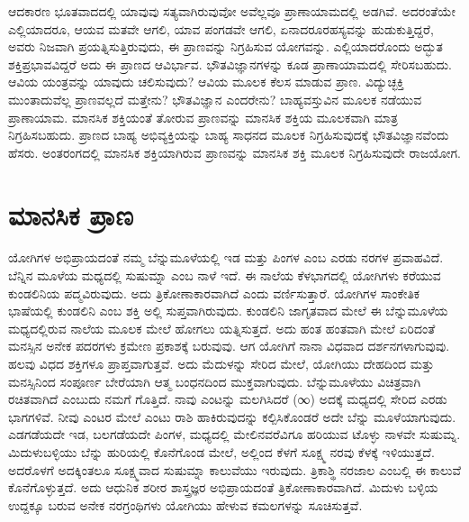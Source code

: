 ಆದಕಾರಣ ಭೂತವಾದದಲ್ಲಿ ಯಾವುವು ಸತ್ಯವಾಗಿರುವುವೋ ಅವೆಲ್ಲವೂ ಪ್ರಾಣಾಯಾಮದಲ್ಲಿ ಅಡಗಿವೆ. ಅದರಂತೆಯೇ ಎಲ್ಲಿಯಾದರೂ, ಆಯವ ಮತವೇ ಆಗಲಿ, ಯಾವ ಪಂಗಡವೇ ಆಗಲಿ, ಏನಾದರೂರಹಸ್ಯವನ್ನು ಹುಡುಕುತ್ತಿದ್ದರೆ, ಅವರು ನಿಜವಾಗಿ ಪ್ರಯತ್ನಿಸುತ್ತಿರುವುದು, ಈ ಪ್ರಾಣವನ್ನು ನಿಗ್ರಹಿಸುವ ಯೋಗವನ್ನು. ಎಲ್ಲಿಯಾದರೊಂದು ಅದ್ಭುತ ಶಕ್ತಿಪ್ರಭಾವವಿದ್ದರೆ ಅದು ಈ ಪ್ರಾಣದ ಆವಿರ್ಭಾವ. ಭೌತವಿಜ್ಞಾನಗಳನ್ನು ಕೂಡ ಪ್ರಾಣಾಯಾಮದಲ್ಲಿ ಸೇರಿಸಬಹುದು. ಆವಿಯ ಯಂತ್ರವನ್ನು ಯಾವುದು ಚಲಿಸುವುದು? ಆವಿಯ ಮೂಲಕ ಕೆಲಸ ಮಾಡುವ ಪ್ರಾಣ. ವಿದ್ಯುಚ್ಛಕ್ತಿ ಮುಂತಾದುವೆಲ್ಲ ಪ್ರಾಣವಲ್ಲದೆ ಮತ್ತೇನು? ಭೌತವಿಜ್ಞಾನ ಎಂದರೇನು? ಬಾಹ್ಯವಸ್ತುವಿನ ಮೂಲಕ ನಡೆಯುವ ಪ್ರಾಣಾಯಾಮ. ಮಾನಸಿಕ ಶಕ್ತಿಯಂತೆ ತೋರುವ ಪ್ರಾಣವನ್ನು ಮಾನಸಿಕ ಶಕ್ತಿಯ ಮೂಲಕವಾಗಿ ಮಾತ್ರ ನಿಗ್ರಹಿಸಬಹುದು. ಪ್ರಾಣದ ಬಾಹ್ಯ ಅಭಿವ್ಯಕ್ತಿಯನ್ನು ಬಾಹ್ಯ ಸಾಧನದ ಮೂಲಕ ನಿಗ್ರಹಿಸುವುದಕ್ಕೆ ಭೌತವಿಜ್ಞಾನವೆಂದು ಹೆಸರು. ಅಂತರಂಗದಲ್ಲಿ ಮಾನಸಿಕ ಶಕ್ತಿಯಾಗಿರುವ ಪ್ರಾಣವನ್ನು ಮಾನಸಿಕ ಶಕ್ತಿ ಮೂಲಕ ನಿಗ್ರಹಿಸುವುದೇ ರಾಜಯೋಗ.

\chapter{ಮಾನಸಿಕ ಪ್ರಾಣ}

\vskip 6pt

ಯೋಗಿಗಳ ಅಭಿಪ್ರಾಯದಂತೆ ನಮ್ಮ ಬೆನ್ನುಮೂಳೆಯಲ್ಲಿ ಇಡ ಮತ್ತು ಪಿಂಗಳ ಎಂಬ ಎರಡು ನರಗಳ ಪ್ರವಾಹವಿದೆ. ಬೆನ್ನಿನ ಮೂಳೆಯ ಮಧ್ಯದಲ್ಲಿ ಸುಷುಮ್ನಾ ಎಂಬ ನಾಳೆ ಇದೆ. ಈ ನಾಲೆಯ ಕೆಳಭಾಗದಲ್ಲಿ ಯೋಗಿಗಳು ಕರೆಯುವ ಕುಂಡಲಿನಿಯ ಪದ್ಮವಿರುವುದು. ಅದು ತ್ರಿಕೋಣಾಕಾರವಾಗಿದೆ ಎಂದು ವರ್ಣಿಸುತ್ತಾರೆ. ಯೋಗಿಗಳ ಸಾಂಕೇತಿಕ ಭಾಷೆಯಲ್ಲಿ ಕುಂಡಲಿನಿ ಎಂಬ ಶಕ್ತಿ ಅಲ್ಲಿ ಸುಪ್ತವಾಗಿರುವುದು. ಕುಂಡಲಿನಿ ಜಾಗೃತವಾದ ಮೇಲೆ ಈ ಬೆನ್ನುಮೂಳೆಯ ಮಧ್ಯದಲ್ಲಿರುವ ನಾಲೆಯ ಮೂಲಕ ಮೇಲೆ ಹೋಗಲು ಯತ್ನಿಸುತ್ತದೆ. ಅದು ಹಂತ ಹಂತವಾಗಿ ಮೇಲೆ ಏರಿದಂತೆ ಮನಸ್ಸಿನ ಅನೇಕ ಪದರಗಳು ಕ್ರಮೇಣ ಪ್ರಕಾಶಕ್ಕೆ ಬರುವುವು. ಆಗ ಯೋಗಿಗೆ ನಾನಾ ವಿಧವಾದ ದರ್ಶನಗಳಾಗುವುವು. ಹಲವು ವಿಧದ ಶಕ್ತಿಗಳೂ ಪ್ರಾಪ್ತವಾಗುತ್ತವೆ. ಅದು ಮೆದುಳನ್ನು ಸೇರಿದ ಮೇಲೆ, ಯೋಗಿಯು ದೇಹದಿಂದ ಮತ್ತು ಮನಸ್ಸಿನಿಂದ ಸಂಪೂರ್ಣ ಬೇರೆಯಾಗಿ ಆತ್ಮ ಬಂಧನದಿಂದ ಮುಕ್ತವಾಗುವುದು. ಬೆನ್ನುಮೂಳೆಯು ವಿಚಿತ್ರವಾಗಿ ರಚಿತವಾಗಿದೆ ಎಂಬುದು ನಮಗೆ ಗೊತ್ತಿದೆ. ನಾವು ಎಂಟನ್ನು ಮಲಗಿಸಿದರೆ (∞) ಅದಕ್ಕೆ ಮಧ್ಯದಲ್ಲಿ ಸೇರಿದ ಎರಡು ಭಾಗಗಳಿವೆ. ನೀವು ಎಂಟರ ಮೇಲೆ ಎಂಟು ರಾಶಿ ಹಾಕಿರುವುದನ್ನು ಕಲ್ಪಿಸಿಕೊಂಡರೆ ಅದೇ ಬೆನ್ನು ಮೂಳೆಯಾಗುವುದು. ಎಡಗಡೆಯದೇ ಇಡ, ಬಲಗಡೆಯದೇ ಪಿಂಗಳ, ಮಧ್ಯದಲ್ಲಿ ಮೇಲಿನವರೆವಿಗೂ ಹರಿಯುವ ಟೊಳ್ಳು ನಾಳವೇ ಸುಷುಮ್ನ. ಮಿದುಳುಬಳ್ಳಿಯು ಬೆನ್ನು ಹುರಿಯಲ್ಲಿ ಕೊನೆಗೊಂಡ ಮೇಲೆ, ಅಲ್ಲಿಂದ ಕೆಳಗೆ ಸೂಕ್ಷ್ಮ ನರವು ಕೆಳಕ್ಕೆ ಇಳಿಯುತ್ತದೆ. ಅದರೊಳಗೆ ಅದಕ್ಕಿಂತಲೂ ಸೂಕ್ಷ್ಮವಾದ ಸುಷುಮ್ನಾ ಕಾಲುವೆಯು ಇರುವುದು. ತ್ರಿಕಾಶ್ಥಿ ನರಜಾಲ ಎಂಬಲ್ಲಿ ಈ ಕಾಲುವೆ ಕೊನೆಗೊಳ್ಳುತ್ತದೆ. ಅದು ಆಧುನಿಕ ಶರೀರ ಶಾಸ್ತ್ರಜ್ಞರ ಅಭಿಪ್ರಾಯದಂತೆ ತ್ರಿಕೋಣಾಕಾರವಾಗಿದೆ. ಮಿದುಳು ಬಳ್ಳಿಯ ಉದ್ದಕ್ಕೂ ಬರುವ ಅನೇಕ ನರಗ್ರಂಥಿಗಳು ಯೋಗಿಯು ಹೇಳುವ ಕಮಲಗಳನ್ನು ಸೂಚಿಸುತ್ತವೆ. 

\vskip 6pt

